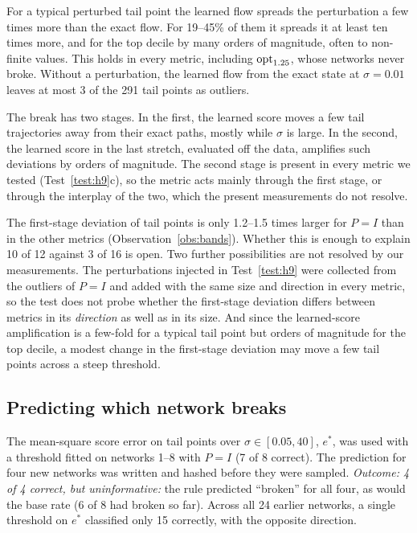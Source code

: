 \begin{observation}
\label{obs:h9}
For a typical perturbed tail point the learned flow spreads the perturbation a few times more than the exact flow.
For 19--45\% of them it spreads it at least ten times more, and for the top decile by many orders of magnitude, often to non-finite values.
This holds in every metric, including $\mathrm{opt}_{1.25}$, whose networks never broke.
Without a perturbation, the learned flow from the exact state at $\sigma=0.01$ leaves at most 3 of the 291 tail points as outliers.
\end{observation}

\begin{conjecture}
\label{conj:twostage}
The break has two stages.
In the first, the learned score moves a few tail trajectories away from their exact paths, mostly while $\sigma$ is large.
In the second, the learned score in the last stretch, evaluated off the data, amplifies such deviations by orders of magnitude.
The second stage is present in every metric we tested (Test~\ref{test:h9}c), so the metric acts mainly through the first stage, or through the interplay of the two, which the present measurements do not resolve.
\end{conjecture}

The first-stage deviation of tail points is only 1.2--1.5 times larger for $P=I$ than in the other metrics (Observation~\ref{obs:bands}).
Whether this is enough to explain 10 of 12 against 3 of 16 is open.
Two further possibilities are not resolved by our measurements.
The perturbations injected in Test~\ref{test:h9} were collected from the outliers of $P=I$ and added with the same size and direction in every metric, so the test does not probe whether the first-stage deviation differs between metrics in its \emph{direction} as well as in its size.
And since the learned-score amplification is a few-fold for a typical tail point but orders of magnitude for the top decile, a modest change in the first-stage deviation may move a few tail points across a steep threshold.

\subsection{Predicting which network breaks}

\begin{test}
\label{test:h7}
The mean-square score error on tail points over $\sigma\in[0.05,40]$, $e^\ast$, was used with a threshold fitted on networks 1--8 with $P=I$ (7 of 8 correct).
The prediction for four new networks was written and hashed before they were sampled.
\emph{Outcome: 4 of 4 correct, but uninformative:} the rule predicted ``broken'' for all four, as would the base rate (6 of 8 had broken so far).
Across all 24 earlier networks, a single threshold on $e^\ast$ classified only 15 correctly, with the opposite direction.
\end{test}

